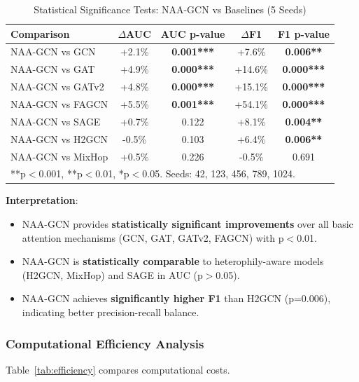 \begin{table}[t]
\centering
\caption{Statistical Significance Tests: NAA-GCN vs Baselines (5 Seeds)}
\label{tab:significance}
\small
\begin{tabular}{lcccc}
\toprule
\textbf{Comparison} & \textbf{$\Delta$AUC} & \textbf{AUC p-value} & \textbf{$\Delta$F1} & \textbf{F1 p-value} \\
\midrule
NAA-GCN vs GCN & +2.1\% & \textbf{0.001***} & +7.6\% & \textbf{0.006**} \\
NAA-GCN vs GAT & +4.9\% & \textbf{0.000***} & +14.6\% & \textbf{0.000***} \\
NAA-GCN vs GATv2 & +4.8\% & \textbf{0.000***} & +15.1\% & \textbf{0.000***} \\
NAA-GCN vs FAGCN & +5.5\% & \textbf{0.001***} & +54.1\% & \textbf{0.000***} \\
NAA-GCN vs SAGE & +0.7\% & 0.122 & +8.1\% & \textbf{0.004**} \\
NAA-GCN vs H2GCN & -0.5\% & 0.103 & +6.4\% & \textbf{0.006**} \\
NAA-GCN vs MixHop & +0.5\% & 0.226 & -0.5\% & 0.691 \\
\bottomrule
\multicolumn{5}{l}{\footnotesize ***p$<$0.001, **p$<$0.01, *p$<$0.05. Seeds: 42, 123, 456, 789, 1024.} \\
\end{tabular}
\end{table}

\textbf{Interpretation}:
\begin{itemize}
\item NAA-GCN provides \textbf{statistically significant improvements} over all basic attention mechanisms (GCN, GAT, GATv2, FAGCN) with p$<$0.01.
\item NAA-GCN is \textbf{statistically comparable} to heterophily-aware models (H2GCN, MixHop) and SAGE in AUC (p$>$0.05).
\item NAA-GCN achieves \textbf{significantly higher F1} than H2GCN (p=0.006), indicating better precision-recall balance.
\end{itemize}

\subsubsection{Computational Efficiency Analysis}

Table~\ref{tab:efficiency} compares computational costs.

